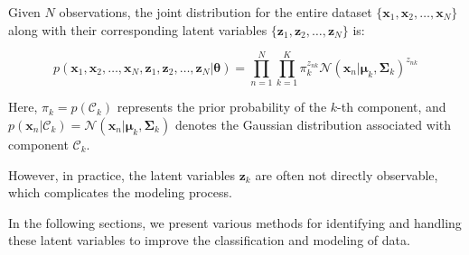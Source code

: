 Given \( N \) observations, the joint distribution for the entire dataset \( \{ \mathbf{x}_1, \mathbf{x}_2, \ldots, \mathbf{x}_N \} \) along with their corresponding latent variables \( \{ \mathbf{z}_1, \mathbf{z}_2, \ldots, \mathbf{z}_N \} \) is:

\[
p(\mathbf{x}_1, \mathbf{x}_2, \ldots, \mathbf{x}_N, \mathbf{z}_1, \mathbf{z}_2, \ldots, \mathbf{z}_N | \boldsymbol{\theta}) = \prod_{n=1}^{N} \prod_{k=1}^{K} \pi_k^{z_{nk}} \mathcal{N}(\mathbf{x}_n | \boldsymbol{\mu}_k, \boldsymbol{\Sigma}_k)^{z_{nk}}
\]

Here, \( \pi_k = p(\mathcal{C}_k) \) represents the prior probability of the \( k \)-th component, and \( p(\mathbf{x}_n | \mathcal{C}_k) = \mathcal{N}(\mathbf{x}_n | \boldsymbol{\mu}_k, \boldsymbol{\Sigma}_k) \) denotes the Gaussian distribution associated with component \( \mathcal{C}_k \).

However, in practice, the latent variables \( \mathbf{z}_k \) are often not directly observable, which complicates the modeling process.

In the following sections, we present various methods for identifying and handling these latent variables to improve the classification and modeling of data.

